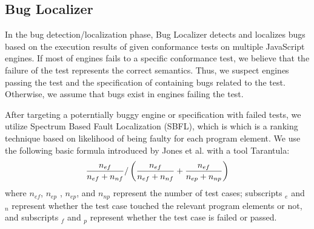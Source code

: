 \subsection{Bug Localizer}

In the bug detection/localization phase, \textsf{Bug Localizer} detects and
localizes bugs based on the execution results of given conformance tests on
multiple JavaScript engines.  If most of engines fails to a specific
conformance test, we believe that the failure of the test represents the
correct semantics.  Thus, we suspect engines passing the test and the
specification of containing bugs related to the test.  Otherwise, we assume
that bugs exist in engines failing the test.

After targeting a poterntially buggy engine or specification with failed tests,
we utilize Spectrum Based Fault Localization (SBFL)\cite{sbfl-survey}, which is
which is a ranking technique based on likelihood of being faulty for each
program element.  We use the following basic formula introduced by Jones et
al. with a tool Tarantula\cite{tarantula, tarantula2}:
\[
  {{n_{ef}}\over{n_{ef} + n_{nf}}} /
  \left(
    {{n_{ef}}\over{n_{ef} + n_{nf}}} +
    {{n_{ef}}\over{n_{ep} + n_{np}}}
  \right)
\]
where $n_{ef}$, $n_{ep}$ , $n_{ep}$, and $n_{np}$ represent the number of test
cases; subscripts ${}_e$ and ${}_n$ represent whether the test case touched the
relevant program elements or not, and subscripts ${}_f$ and ${}_p$ represent
whether the test case is failed or passed.

